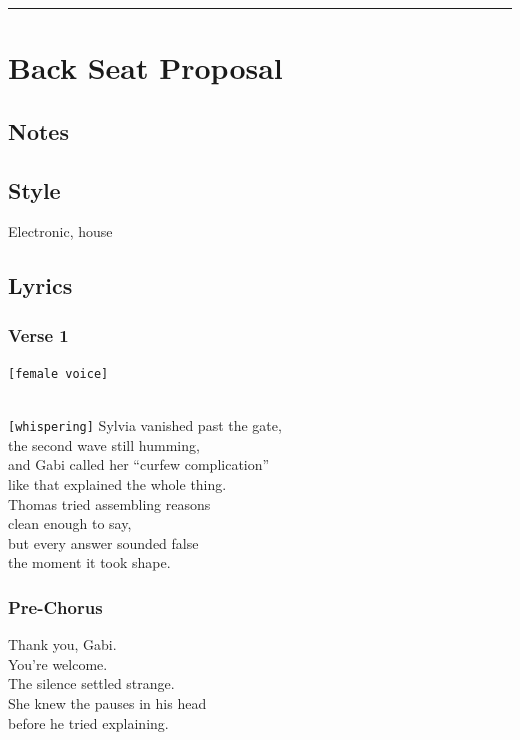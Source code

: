 \documentclass[]{article}
\begin{document}
\begin{center}\rule{0.5\linewidth}{0.5pt}\end{center}

\section{Back Seat Proposal}\label{back-seat-proposal}

\subsection{Notes}\label{notes-13}

\subsection{Style}\label{style-13}

Electronic, house

\subsection{Lyrics}\label{lyrics-13}

\subsubsection{Verse 1}\label{verse-1-8}

\texttt{{[}female\ voice{]}}\strut \\
\texttt{{[}whispering{]}} Sylvia vanished past the gate,\\
the second wave still humming,\\
and Gabi called her ``curfew complication''\\
like that explained the whole thing.\\
Thomas tried assembling reasons\\
clean enough to say,\\
but every answer sounded false\\
the moment it took shape.

\subsubsection{Pre-Chorus}\label{pre-chorus-9}

Thank you, Gabi.\\
You're welcome.\\
The silence settled strange.\\
She knew the pauses in his head\\
before he tried explaining.
\end{document}
